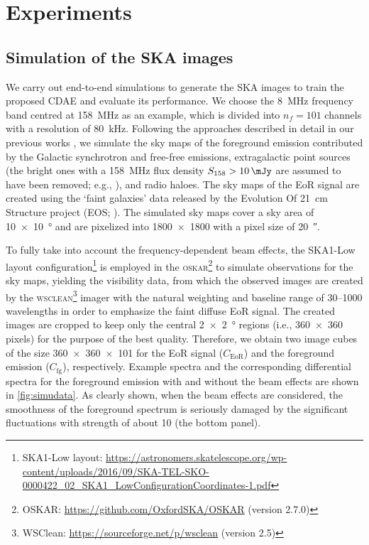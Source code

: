 \documentclass[letters,fleqn,usenatbib]{mnras}
\newcommand{\R}[1]{\mathrm{#1}}
\begin{document}
\section{Experiments}
\label{sec:experiments}

\subsection{Simulation of the SKA images}
\label{sec:simulation}

We carry out end-to-end simulations to generate the SKA images to
train the proposed CDAE and evaluate its performance.
We choose the \SI{8}{\MHz} frequency band centred at \SI{158}{\MHz} as
an example, which is divided into $n_f = 101$ channels with a resolution
of \SI{80}{\kHz}.
Following the approaches described in detail in our previous works
\citep{wang2010,wang2013}, we simulate the sky maps of the foreground
emission contributed by the Galactic synchrotron and free-free
emissions, extragalactic point sources (the bright ones with a
\SI{158}{\MHz} flux density $S_{158} > \SI{10}{\mJy}$ are assumed to
have been removed; e.g., \citealt{liu2009ps}), and radio haloes.
The sky maps of the EoR signal are created using the `faint galaxies'
data released by the Evolution Of 21~cm Structure project
(EOS; \citealt{mesinger2016}).
The simulated sky maps cover a sky area of \SI{10 x 10}{\degree} and are
pixelized into \num{1800 x 1800} with a pixel size of \SI{20}{\arcsecond}.

To fully take into account the frequency-dependent beam effects,
the SKA1-Low layout configuration\footnote{\raggedright%
  SKA1-Low layout:
  \url{https://astronomers.skatelescope.org/wp-content/uploads/2016/09/SKA-TEL-SKO-0000422_02_SKA1_LowConfigurationCoordinates-1.pdf}}
is employed in the \textsc{oskar}\footnote{%
  OSKAR: \url{https://github.com/OxfordSKA/OSKAR} (version 2.7.0)}
\citep{mort2010} to simulate observations for the sky maps,
yielding the visibility data, from which the observed images are created
by the \textsc{wsclean}\footnote{%
  WSClean: \url{https://sourceforge.net/p/wsclean} (version 2.5)}
imager \citep{offringa2014} with the natural weighting and baseline
range of \numrange{30}{1000} wavelengths in order to emphasize the
faint diffuse EoR signal.
The created images are cropped to keep only the central
\SI{2 x 2}{\degree} regions (i.e., \num{360 x 360} pixels) for the
purpose of the best quality.
Therefore, we obtain two image cubes of the size \num{360 x 360 x 101}
for the EoR signal ($C_{\R{EoR}}$) and the foreground emission
($C_{\R{fg}}$), respectively.
Example spectra and the corresponding differential spectra for the
foreground emission with and without the beam effects are shown in
\autoref{fig:simudata}.
As clearly shown, when the beam effects are considered, the smoothness
of the foreground spectrum is seriously damaged by the significant
fluctuations with strength of about \SI{10}{\mK} (the bottom panel).
\end{document}

